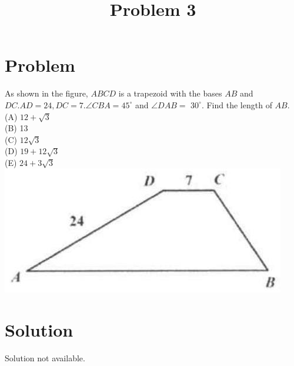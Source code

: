 \documentclass{article}
\title{Problem 3}
\date{}
\begin{document}
\maketitle

\section*{Problem}
As shown in the figure, \(A B C D\) is a trapezoid with the bases \(A B\) and \(D C . A D=24, D C=7 . \angle C B A=45^{\circ}\) and \(\angle D A B=\) \(30^{\circ}\). Find the length of \(A B\).\\
(A) \(12+\sqrt{3}\)\\
(B) 13\\
(C) \(12 \sqrt{3}\)\\
(D) \(19+12 \sqrt{3}\)\\
(E) \(24+3 \sqrt{3}\)\\
\centering
\includegraphics[width=\textwidth]{images/088(1).jpg}

\section*{Solution}
Solution not available.
\end{document}

